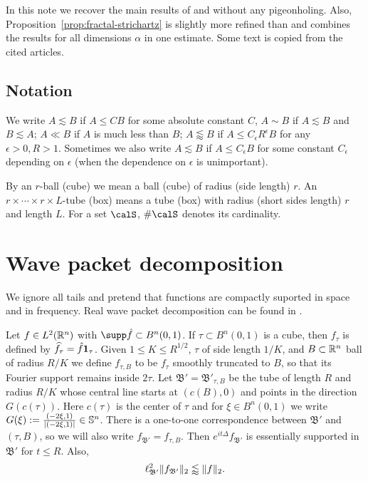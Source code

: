 \documentclass[biblatex]{pzorin-note}
\newcommand{\eit}{e^{i t \Delta}}
\newcommand{\bbS}{\mathbb{S}}
\newcommand{\bBp}{\mathfrak{B}'} %
\begin{document}
In this note we recover the main results of \cite{MR3842310} and \cite{arxiv:1805.02775} without any pigeonholing.
Also, Proposition~\ref{prop:fractal-strichartz} is slightly more refined than \cite[Proposition 3.1]{arxiv:1805.02775} and combines the results for all dimensions $\alpha$ in one estimate.
Some text is copied from the cited articles.


\subsection*{Notation}
We write $A\lesssim B$ if $A\leq CB$ for some absolute constant $C$, $A \sim B$ if $A\lesssim B$ and $B\lesssim A$; $A\ll B$ if $A$ is much less than $B$; $A\lessapprox B$ if $A\leq C_\epsilon R^\epsilon B$ for any $\epsilon>0, R>1$.
Sometimes we also write $A\lesssim B$ if $A\leq C_\epsilon B$ for some constant $C_\epsilon$ depending on $\epsilon$ (when the dependence on $\epsilon$ is unimportant).

By an $r$-ball (cube) we mean a ball (cube) of radius (side length) $r$.
An $r\times\cdots\times r \times L$-tube (box) means a tube (box) with radius (short sides length) $r$ and length $L$.
For a set $\calS$, $\#\calS$ denotes its cardinality.

\section{Wave packet decomposition}
We ignore all tails and pretend that functions are compactly suported in space and in frequency.
Real wave packet decomposition can be found in \cite{MR3454378}.

Let $f \in L^{2}(\mathbb{R}^{n})$ with $\supp \hat{f} \subset B^{n}(0,1)$.
If $\tau \subset B^{n}(0,1)$ is a cube, then $f_{\tau}$ is defined by $\widehat{f_{\tau}} = \hat{f} \mathbf{1}_{\tau}$.
Given $1 \leq K \leq R^{1/2}$, $\tau$ of side length $1/K$, and $B \subset \mathbb{R}^{n}$ ball of radius $R/K$ we define $f_{\tau,B}$ to be $f_{\tau}$ smoothly truncated to $B$, so that its Fourier support remains inside $2\tau$.
Let $\bBp = \bBp_{\tau, B}$ be the tube of length $R$ and radius $R/K$ whose central line starts at $(c(B),0)$ and points in the direction $G(c(\tau))$.
Here $c(\tau)$ is the center of $\tau$ and for $\xi \in B^{n}(0,1)$ we write $G(\xi):=\frac{(-2\xi,1)}{\abs{(-2\xi,1)}} \in \bbS^n$.
There is a one-to-one correspondence between $\bBp$ and $(\tau, B)$, so we will also write $f_{\bBp} = f_{\tau,B}$.
Then $\eit f_{\bBp}$ is essentially supported in $\bBp$ for $t\leq R$.
Also,
\begin{equation}
\label{eq:orthogonality}
\ell^{2}_{\bBp} \norm{f_{\bBp}}_{2}
\lessapprox
\norm{f}_{2}.
\end{equation}
\end{document}
